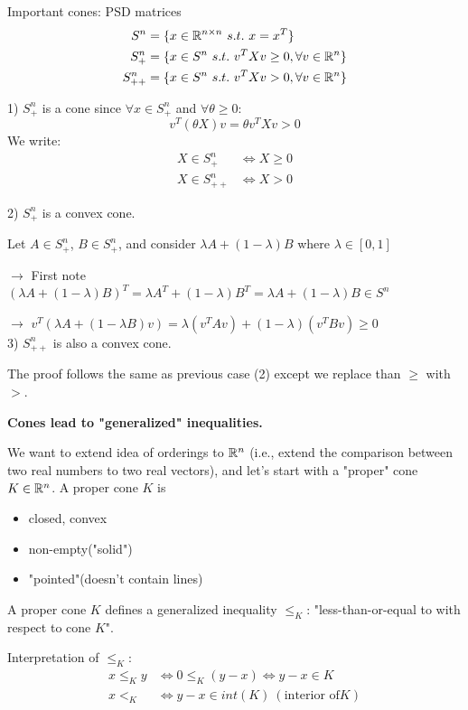 Important cones: PSD matrices
\begin{align*}
S^n &= \{x\in \mathbb{R}^{n\times n}\ s.t.\ x = x^T \}\\
S^n_+ &= \{x\in S^{n}\ s.t.\ v^TXv \geq 0, \forall v\in \mathbb{R}^n \}\\
S^n_{++} &= \{x\in S^{n}\ s.t.\ v^TXv > 0 ,\forall v\in \mathbb{R}^n\}
\end{align*}

1) $S_+^n$ is a cone since $\forall x \in S_+^n$ and $\forall \theta \geq 0$:
$$v^T(\theta X)v = \theta v^TXv  > 0$$
We write:
\begin{align*}
X\in S^n_+ &\Leftrightarrow X\geq 0\\
X\in S^n_{++} &\Leftrightarrow X> 0
\end{align*}

2) $S_+^n$ is a convex cone.

Let $A\in S^n_+$, $B\in S^n_+$, and consider $\lambda A + (1-\lambda)B$ where $\lambda \in [0,1]$

$\rightarrow$ First note $(\lambda A + (1-\lambda)B)^T= \lambda A^T + (1-\lambda)B^T = \lambda A + (1-\lambda)B \in S^n$

$\rightarrow$ $v^T(\lambda A + (1-\lambda B)v) =\lambda(v^TAv) + (1-\lambda)(v^TBv)\geq 0$\\

 
3) $S^n_{++}$ is also a convex cone. 

The proof follows the same as previous case (2) except we replace than $\geq$ with $>$.

\vspace{0.3cm}
\textbf{Cones lead to "generalized" inequalities.}

We want to extend idea of orderings to $\mathbb{R}^n$ (i.e., extend the comparison between two real numbers to two real vectors), and let's start with a "proper" cone $K\in \mathbb{R}^n$. A proper cone $K$ is
\begin{itemize}
	\item closed, convex
	
	\item non-empty("solid")
	
	\item "pointed"(doesn't contain lines)
\end{itemize}


A proper cone $K$ defines a generalized inequality $\leq_K$: "less-than-or-equal to with respect to cone $K$".

Interpretation of $\leq_K$:
\begin{align*}
x\leq_K y &\Leftrightarrow 0\leq_K (y-x)\Leftrightarrow y - x \in K\\
x <_K &\Leftrightarrow y-x\in int(K)\ (\text{interior of} K)
\end{align*}

